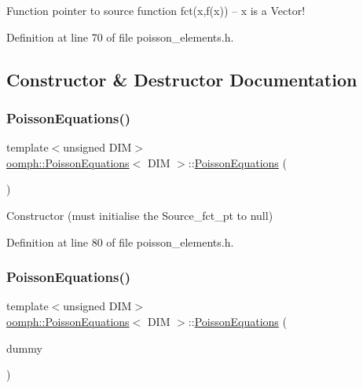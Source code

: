 Function pointer to source function fct(x,f(x)) -- x is a Vector! 



Definition at line 70 of file poisson\+\_\+elements.\+h.



\subsection{Constructor \& Destructor Documentation}
\mbox{\label{classoomph_1_1PoissonEquations_a338ad18dee2ce6f7afb55211b66b1634}} 
\subsubsection{\texorpdfstring{Poisson\+Equations()}{PoissonEquations()}\hspace{0.1cm}{\footnotesize\ttfamily [1/2]}}
{\footnotesize\ttfamily template$<$unsigned D\+IM$>$ \\
\hyperlink{classoomph_1_1PoissonEquations}{oomph\+::\+Poisson\+Equations}$<$ D\+IM $>$\+::\hyperlink{classoomph_1_1PoissonEquations}{Poisson\+Equations} (\begin{DoxyParamCaption}{ }\end{DoxyParamCaption})\hspace{0.3cm}{\ttfamily [inline]}}



Constructor (must initialise the Source\+\_\+fct\+\_\+pt to null) 



Definition at line 80 of file poisson\+\_\+elements.\+h.

\mbox{\label{classoomph_1_1PoissonEquations_ad41c83d9d92cb124d50b24dc237854cf}} 
\subsubsection{\texorpdfstring{Poisson\+Equations()}{PoissonEquations()}\hspace{0.1cm}{\footnotesize\ttfamily [2/2]}}
{\footnotesize\ttfamily template$<$unsigned D\+IM$>$ \\
\hyperlink{classoomph_1_1PoissonEquations}{oomph\+::\+Poisson\+Equations}$<$ D\+IM $>$\+::\hyperlink{classoomph_1_1PoissonEquations}{Poisson\+Equations} (\begin{DoxyParamCaption}\item[{const \hyperlink{classoomph_1_1PoissonEquations}{Poisson\+Equations}$<$ D\+IM $>$ \&}]{dummy }\end{DoxyParamCaption})\hspace{0.3cm}{\ttfamily [inline]}}



